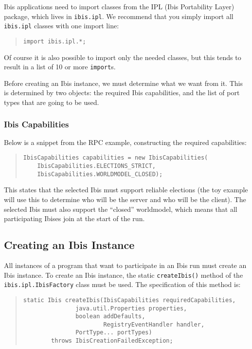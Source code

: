 \documentclass[10pt]{article}
\newcommand{\mysubsection}[1]{\subsection{#1}\label{#1}}
\newcommand{\mysubsubsection}[1]{\subsubsection{#1}\label{#1}}
\begin{document}
Ibis applications need to import classes from the IPL (Ibis
Portability Layer) package, which lives in
\texttt{ibis.ipl}.
We recommend that you simply import all \texttt{ibis.ipl} classes with
one import line:

{\small
\begin{quote}
\begin{verbatim}
import ibis.ipl.*;
\end{verbatim}
\end{quote}
}

\noindent
Of course it is also possible to import only the needed classes, but
this tends to result in a list of 10 or more \texttt{import}s.

Before creating an Ibis instance, we must determine what we want from it.
This is determined by two objects: the required Ibis capabilities, and
the list of port types that are going to be used.

\mysubsubsection{Ibis Capabilities}

Below is a snippet from the RPC example, constructing the required capabilities:
{\small
\begin{quote}
\begin{verbatim}
IbisCapabilities capabilities = new IbisCapabilities(
    IbisCapabilities.ELECTIONS_STRICT,
    IbisCapabilities.WORLDMODEL_CLOSED);
\end{verbatim}
\end{quote}
}

This states that the selected Ibis must support reliable elections
(the toy example will use this to determine who will be the server and
who will be the client). The selected Ibis
must also support the ``closed'' worldmodel, which means
that all participating Ibises join at the start of the run.

\mysubsection{Creating an Ibis Instance}

All instances of a program that want to participate in an Ibis run
must create an Ibis instance.
To create an Ibis instance, the static \texttt{createIbis()} method of the
\texttt{ibis.ipl.IbisFactory} class must be used.
The specification of this method is:
{\small
\begin{quote}
\begin{verbatim}
static Ibis createIbis(IbisCapabilities requiredCapabilities,
		       java.util.Properties properties,
		       boolean addDefaults,
                       RegistryEventHandler handler,
		       PortType... portTypes)
        throws IbisCreationFailedException;
\end{verbatim}
\end{quote}
}
\end{document}
